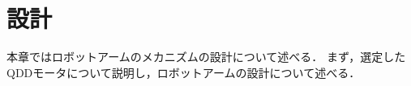 \chapter{設計}
\label{chap:third}
%
本章ではロボットアームのメカニズムの設計について述べる．
まず，選定したQDDモータについて説明し，ロボットアームの設計について述べる．






%
